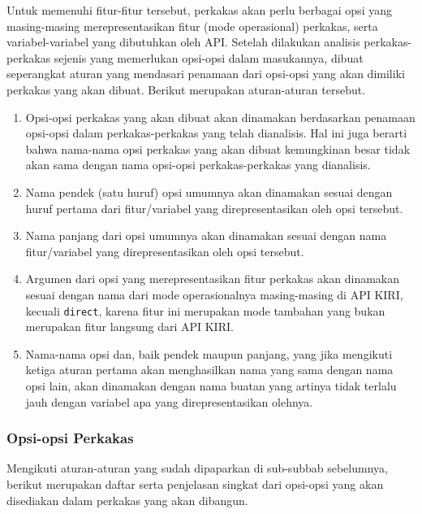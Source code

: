 Untuk memenuhi fitur-fitur tersebut, perkakas akan perlu berbagai opsi yang masing-masing merepresentasikan fitur (mode operasional) perkakas, serta variabel-variabel yang dibutuhkan oleh API. Setelah dilakukan analisis perkakas-perkakas sejenis yang memerlukan opsi-opsi dalam masukannya, dibuat seperangkat aturan yang mendasari penamaan dari opsi-opsi yang akan dimiliki perkakas yang akan dibuat. Berikut merupakan aturan-aturan tersebut.

\begin{enumerate}
	\item Opsi-opsi perkakas yang akan dibuat akan dinamakan berdasarkan penamaan opsi-opsi dalam perkakas-perkakas yang telah dianalisis. Hal ini juga berarti bahwa nama-nama opsi perkakas yang akan dibuat kemungkinan besar tidak akan sama dengan nama opsi-opsi perkakas-perkakas yang dianalisis.
	\item Nama pendek (satu huruf) opsi umumnya akan dinamakan sesuai dengan huruf pertama dari fitur/variabel yang direpresentasikan oleh opsi tersebut.
	\item Nama panjang dari opsi umumnya akan dinamakan sesuai dengan nama fitur/variabel yang direpresentasikan oleh opsi tersebut.
	\item Argumen dari opsi yang merepresentasikan fitur perkakas akan dinamakan sesuai dengan nama dari mode operasionalnya masing-masing di API KIRI, kecuali \texttt{direct}, karena fitur ini merupakan mode tambahan yang bukan merupakan fitur langsung dari API KIRI.
	\item Nama-nama opsi dan, baik pendek maupun panjang, yang jika mengikuti ketiga aturan pertama akan menghasilkan nama yang sama dengan nama opsi lain, akan dinamakan dengan nama buatan yang artinya tidak terlalu jauh dengan variabel apa yang direpresentasikan olehnya.
\end{enumerate}

\subsubsection{Opsi-opsi Perkakas}
\label{sec:analysis-thesisapp-features-options}

Mengikuti aturan-aturan yang sudah dipaparkan di sub-subbab sebelumnya, berikut merupakan daftar serta penjelasan singkat dari opsi-opsi yang akan disediakan dalam perkakas yang akan dibangun.

